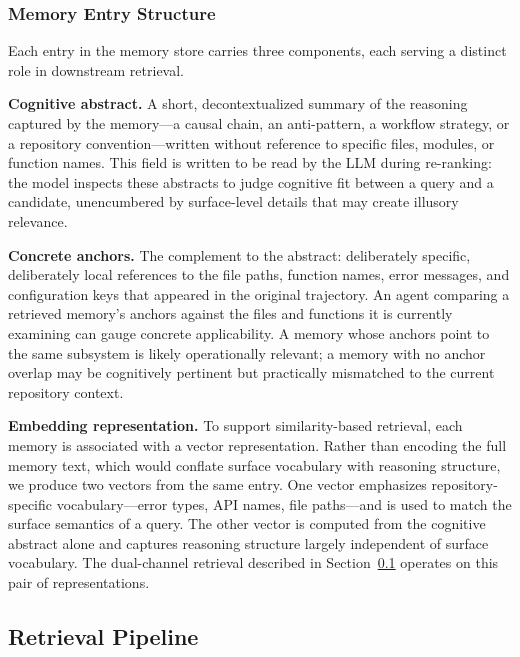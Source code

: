 \documentclass[letterpaper]{article} %
\begin{document}
\subsubsection{Memory Entry Structure}
\label{sec:entry}

Each entry in the memory store carries three components, each serving a distinct role in downstream retrieval.

\textbf{Cognitive abstract.} A short, decontextualized summary of the reasoning captured by the memory---a causal chain, an anti-pattern, a workflow strategy, or a repository convention---written without reference to specific files, modules, or function names. This field is written to be read by the LLM during re-ranking: the model inspects these abstracts to judge cognitive fit between a query and a candidate, unencumbered by surface-level details that may create illusory relevance.

\textbf{Concrete anchors.} The complement to the abstract: deliberately specific, deliberately local references to the file paths, function names, error messages, and configuration keys that appeared in the original trajectory. An agent comparing a retrieved memory's anchors against the files and functions it is currently examining can gauge concrete applicability. A memory whose anchors point to the same subsystem is likely operationally relevant; a memory with no anchor overlap may be cognitively pertinent but practically mismatched to the current repository context.

\textbf{Embedding representation.} To support similarity-based retrieval, each memory is associated with a vector representation. Rather than encoding the full memory text, which would conflate surface vocabulary with reasoning structure, we produce two vectors from the same entry. One vector emphasizes repository-specific vocabulary---error types, API names, file paths---and is used to match the surface semantics of a query. The other vector is computed from the cognitive abstract alone and captures reasoning structure largely independent of surface vocabulary. The dual-channel retrieval described in Section~\ref{sec:retrieval} operates on this pair of representations.

\subsection{Retrieval Pipeline}
\label{sec:retrieval}
\end{document}
